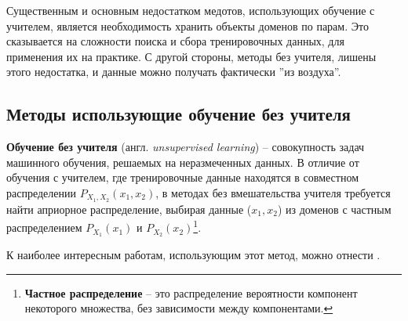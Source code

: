\documentclass[11pt,a4paper]{extarticle}
\begin{document}
				Существенным и основным недостатком медотов, использующих обучение с учителем, является необходимость хранить объекты доменов по парам.
				Это сказывается на сложности поиска и сбора тренировочных данных, для применения их на практике.
				С другой стороны, методы без учителя, лишены этого недостатка, и данные можно получать фактически ''из воздуха''.
				
				
		\subsection{Методы использующие обучение без учителя}
			\textbf{Обучение без учителя} (англ. \textit{unsupervised learning}) -- совокупность задач машинного обучения, решаемых на неразмеченных данных.
			В отличие от обучения с учителем, где тренировочные данные находятся в совместном распределении \(P_{X_{1},X_{2}}(x_{1},x_{2})\), в методах без вмешательства учителя требуется
			найти априорное распределение, выбирая данные (\(x_{1},x_{2}\)) из доменов с частным распределением \(P_{X_{1}}(x_{1})\) и  \(P_{X_{2}}(x_{2})\)\footnote{
				\textbf{Частное распределение} -- это распределение вероятности компонент некоторого множества, без зависимости между компонентами.
			}.

			К наиболее интересным работам, использующим этот метод, можно отнести \cite{UNIT,MUNIT,CycleGAN}.

			


\newpage
\end{document}
